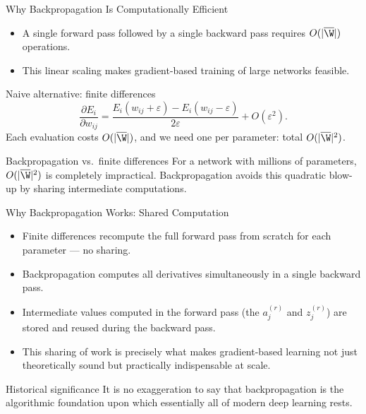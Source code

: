 \begin{frame}{Why Backpropagation Is Computationally Efficient}
  \begin{itemize}
    \item A single forward pass followed by a single backward pass requires $O(|\overline{\W}|)$ operations.
    \item This \alert{linear scaling} makes gradient-based training of large networks feasible.
  \end{itemize}
  \begin{block}{Naive alternative: finite differences}
    \[
      \frac{\partial E_i}{\partial w_{ij}} = \frac{E_i(w_{ij}+\varepsilon)-E_i(w_{ij}-\varepsilon)}{2\varepsilon} + O(\varepsilon^2).
    \]
    Each evaluation costs $O(|\overline{\W}|)$, and we need one per parameter: total $O(|\overline{\W}|^2)$.
  \end{block}
  \begin{alertblock}{Backpropagation vs.\ finite differences}
    For a network with millions of parameters, $O(|\overline{\W}|^2)$ is \alert{completely impractical}.
    Backpropagation avoids this quadratic blow-up by sharing intermediate computations.
  \end{alertblock}
\end{frame}

\begin{frame}{Why Backpropagation Works: Shared Computation}
  \begin{itemize}
    \item Finite differences \alert{recompute the full forward pass} from scratch for each parameter — no sharing.
    \item Backpropagation computes all derivatives \alert{simultaneously} in a single backward pass.
    \item Intermediate values computed in the forward pass (the $a_j^{(r)}$ and $z_j^{(r)}$) are stored and \alert{reused} during the backward pass.
    \item This sharing of work is precisely what makes gradient-based learning not just theoretically sound but \alert{practically indispensable at scale}.
  \end{itemize}
  \begin{block}{Historical significance}
    It is no exaggeration to say that backpropagation is the \alert{algorithmic foundation} upon which essentially all of modern deep learning rests.
  \end{block}
\end{frame}

